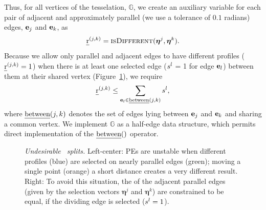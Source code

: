 Thus, for all vertices of the tesselation, $\mathbb{G}$, we create an auxiliary variable for each pair of adjacent and approximately parallel (we use a tolerance of $0.1$ radians) edges, $\mathbf{e}_j$ and $\mathbf{e}_k$, as
%
$$\differentProfiles{}^{(j,k)} =
\isDifferent{\mathbold{\eta}^j,\mathbold{\eta}^k}.$$
%
Because we allow only parallel and adjacent edges to have different profiles ($\text{\emph{r}}{}^{(j,k)} = 1$) when there is at least one selected edge ($s{}^l$ = 1 for edge $\mathbf{e}_l$) between them at their shared vertex (Figure~\ref{fig:nearParallelProfiles}), we require 
%
$$ \text{\emph{r}}{}^{(j,k)} \leq \sum_{\mathbf{e}_l \in \text{\emph{between}}{(j,k)}} s{}^l,$$
%
where $\text{\emph{between}}(j,k)$ denotes the set of edges lying between $\mathbf{e}_j$ and $\mathbf{e}_k$ and sharing a common vertex. 
We implement $\mathbb{G}$ as a half-edge data structure, which permits direct implementation of the $\text{\emph{between}}()$ operator.

\begin{figure}[t!]
    \centering
  \def\svgwidth{1\columnwidth}  
    
  \caption{{\it Undesirable \facade\ splits.} Left-center: PEs are unstable when different profiles (blue) are selected on nearly parallel edges (green); moving a single point (orange) a short distance creates a very different result.  Right: To avoid this situation, the \cleanprofiles of the adjacent parallel edges (given by the selection vectors $\mathbold{\eta}^j$ and $\mathbold{\eta}^k$) are constrained to be equal, if the dividing edge is selected ($s^l = 1$).}
  \label{fig:nearParallelProfiles}
  \vnudge
\end{figure}


